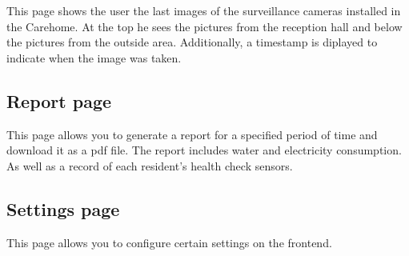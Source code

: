 This page shows the user the last images of the surveillance cameras installed in the Carehome.
At the top he sees the pictures from the reception hall and below the pictures from the outside area. Additionally, a timestamp is diplayed to indicate when the image was taken.

\subsection{Report page}

This page allows you to generate a report for a specified period of time and download it as a pdf file.
The report includes water and electricity consumption. As well as a record of each resident's health check sensors.


\subsection{Settings page}
This page allows you to configure certain settings on the frontend.
